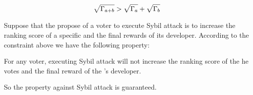 \begin{align}
	\label{eq:sqrt_nr}
	\sqrt{\Gamma_{a+b}}>\sqrt{\Gamma_a}+\sqrt{\Gamma_b}
\end{align}

Suppose that the propose of a voter to execute Sybil attack is to increase the ranking score of a specific and the final rewards of its developer. According to the constraint above we have the following property:


\begin{property}
	\label{p3}
    For any voter, executing Sybil attack will not increase the ranking score of the \dapp he votes and the final reward of the \dapp's developer.
\end{property}
So the property against Sybil attack is guaranteed.